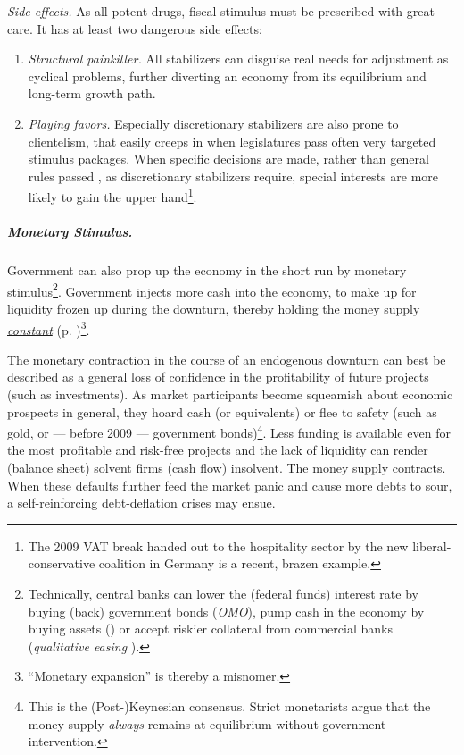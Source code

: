 \emph{Side effects.} As all potent drugs, fiscal stimulus must be prescribed with great care. It has at least two dangerous side effects:
\begin{enumerate}
	\item \emph{Structural painkiller.} All stabilizers can disguise real needs for adjustment as cyclical problems, further diverting an economy from its equilibrium and long-term growth path.  
	\item \emph{Playing favors.} Especially discretionary stabilizers are also prone to clientelism, that easily creeps in when legislatures pass often very targeted stimulus packages. When specific decisions are made, rather than general rules passed \citep{Weber-1918-aa}, as discretionary stabilizers require, special interests are more likely to gain the upper hand\footnote{
		The 2009 VAT break handed out to the hospitality sector by the new liberal-conservative coalition in Germany is a recent, brazen example.}.
\end{enumerate}

\subparagraph{Monetary Stimulus.}  \label{sec:monetarystimulus}
Government can also prop up the economy in the short run by monetary stimulus\footnote{
	Technically, central banks can lower the (federal funds) interest rate by buying (back) government bonds (\emph{\gls{OMO}}), pump cash in the economy by buying assets () or accept riskier collateral from commercial banks (\emph{qualitative easing} \citep{Buiter2008}).}. 
Government injects more cash into the economy, to make up for liquidity frozen up during the downturn, thereby \hyperref[sec:pricestability]{holding the money supply \emph{constant}} (p. \pageref{sec:pricestability})\footnote{
	``Monetary expansion'' is thereby a misnomer.}.

The monetary contraction in the course of an endogenous downturn can best be described as a general loss of confidence in the profitability of future projects (such as investments). As market participants become squeamish about economic prospects in general, they hoard cash (or equivalents) or flee to safety (such as gold, or --- before 2009 --- government bonds)\footnote{
	This is the (Post-)Keynesian consensus. Strict monetarists argue that the money supply \emph{always} remains at equilibrium without government intervention.}. 
Less funding is available even for the most profitable and risk-free projects and the lack of liquidity can render (balance sheet) solvent firms (cash flow) insolvent. The money supply contracts. When these defaults further feed the market panic and cause more debts to sour, a self-reinforcing debt-deflation crises may ensue. %

